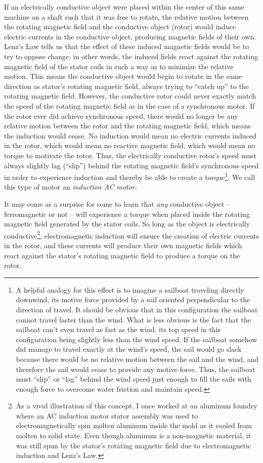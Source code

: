 If an electrically conductive object were placed within the center of this same machine on a shaft such that it was free to rotate, the relative motion between the rotating magnetic field and the conductive object (rotor) would induce electric currents in the conductive object, producing magnetic fields of their own.  Lenz's Law tells us that the effect of these induced magnetic fields would be to try to oppose change: in other words, the induced fields react against the rotating magnetic field of the stator coils in such a way as to minimize the relative motion.  This means the conductive object would begin to rotate in the same direction as stator's rotating magnetic field, always trying to ``catch up'' to the rotating magnetic field.  However, the conductive rotor could never exactly match the speed of the rotating magnetic field as in the case of a synchronous motor.  If the rotor ever did achieve synchronous speed, there would no longer be any relative motion between the rotor and the rotating magnetic field, which means the induction would cease.  No induction would mean no electric currents induced in the rotor, which would mean no reactive magnetic field, which would mean no torque to motivate the rotor.  Thus, the electrically conductive rotor's speed must always slightly lag (``slip'') behind the rotating magnetic field's synchronous speed in order to experience induction and thereby be able to create a torque\footnote{A helpful analogy for this effect is to imagine a sailboat traveling directly downwind, its motive force provided by a sail oriented perpendicular to the direction of travel.  It should be obvious that in this configuration the sailboat cannot travel faster than the wind.  What is less obvious is the fact that the sailboat can't even travel as fast as the wind, its top speed in this configuration being slightly less than the wind speed.  If the sailboat somehow did manage to travel exactly at the wind's speed, the sail would go slack because there would be no relative motion between the sail and the wind, and therefore the sail would cease to provide any motive force.  Thus, the sailboat must ``slip'' or ``lag'' behind the wind speed just enough to fill the sails with enough force to overcome water friction and maintain speed.}.  We call this type of motor an \textit{induction AC motor}.

It may come as a surprise for some to learn that \textit{any} conductive object -- ferromagnetic or not -- will experience a torque when placed inside the rotating magnetic field generated by the stator coils.  So long as the object is electrically conductive\footnote{As a vivid illustration of this concept, I once worked at an aluminum foundry where an AC induction motor stator assembly was used to electromagnetically spin molten aluminum inside the mold as it cooled from molten to solid state.  Even though aluminum is a non-magnetic material, it was still spun by the stator's rotating magnetic field due to electromagnetic induction and Lenz's Law.}, electromagnetic induction will ensure the creation of electric currents in the rotor, and these currents will produce their own magnetic fields which react against the stator's rotating magnetic field to produce a torque on the rotor.

